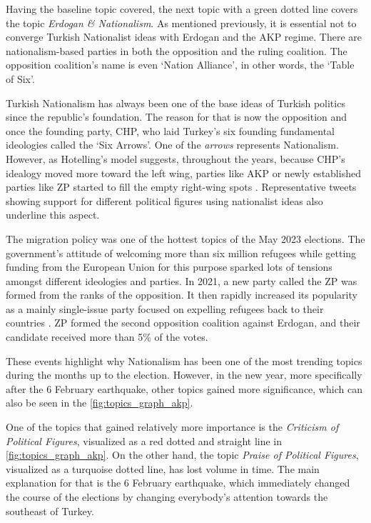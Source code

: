 Having the baseline topic covered, the next topic with a green dotted line covers the topic 
\textit{Erdogan \& Nationalism}. As mentioned previously, it is essential not to converge Turkish 
Nationalist ideas with Erdogan and the AKP regime. There are nationalism-based parties in both the 
opposition and the ruling coalition. The opposition coalition's name is even `Nation Alliance', 
in other words, the `Table of Six'.

Turkish Nationalism has always been one of the base ideas of Turkish politics since the republic's 
foundation. The reason for that is now the opposition and once the founding party, \ac{CHP}, who laid 
Turkey's six founding fundamental ideologies called the `Six Arrows'. 
One of the \textit{arrows} represents Nationalism. However, as Hotelling's model suggests, 
throughout the years, because CHP's idealogy moved more toward the left wing, parties like AKP or 
newly established parties like ZP started to fill the empty right-wing spots \parencite{caramani_comparative_politics_2020}. 
Representative tweets showing support for different political figures using nationalist 
ideas also underline this aspect. 

The migration policy was one of the hottest topics of the May 2023 elections. 
The government's attitude of welcoming more than six million refugees while getting funding from the 
European Union for this purpose sparked lots of tensions amongst different ideologies and parties. 
In 2021, a new party called the \ac{ZP} was formed from the ranks of the opposition. 
It then rapidly increased its popularity as a mainly single-issue party focused on expelling refugees 
back to their countries \parencite{berk_esen_turkish_politics_2023}. \ac{ZP} formed the second opposition 
coalition against Erdogan, and their candidate received more than 5\% of the votes. 

These events highlight why Nationalism has been one of the most trending topics during the months up 
to the election. However, in the new year, more specifically after the 6 February earthquake, other 
topics gained more significance, which can also be seen in the \autoref{fig:topics_graph_akp}.

One of the topics that gained relatively more importance is the \textit{Criticism of Political Figures}, 
visualized as a red dotted and straight line in \autoref{fig:topics_graph_akp}. On the other hand, 
the topic \textit{Praise of Political Figures}, visualized as a turquoise dotted line, has lost volume 
in time. The main explanation for that is the 6 February earthquake, which immediately changed 
the course of the elections by changing everybody's attention towards the southeast of Turkey. 

